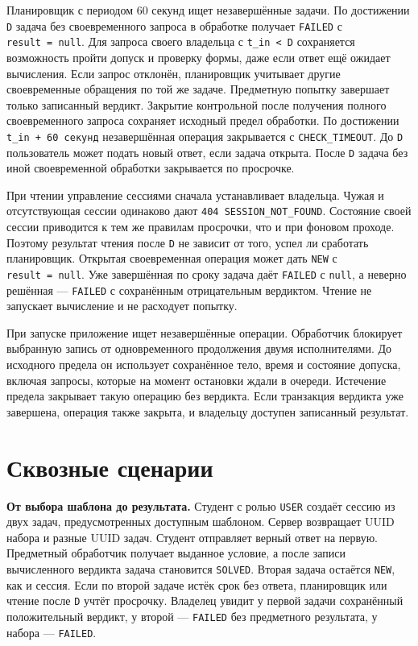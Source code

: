 \documentclass[12pt,a4paper]{article}
\begin{document}
\hypertarget{5-срок-чтение-и-восстановление}{}

Планировщик с периодом 60 секунд ищет незавершённые задачи. По достижении \texttt{D} задача без своевременного запроса в обработке получает \texttt{FAILED} с \texttt{result\ =\ null}. Для запроса своего владельца с \texttt{t\_in\ \textless{}\ D} сохраняется возможность пройти допуск и проверку формы, даже если ответ ещё ожидает вычисления. Если запрос отклонён, планировщик учитывает другие своевременные обращения по той же задаче. Предметную попытку завершает только записанный вердикт. Закрытие контрольной после получения полного своевременного запроса сохраняет исходный предел обработки. По достижении \texttt{t\_\allowbreak{}in + 60 секунд} незавершённая операция закрывается с \texttt{CHECK\_\allowbreak{}TIMEOUT}. До \texttt{D} пользователь может подать новый ответ, если задача открыта. После \texttt{D} задача без иной своевременной обработки закрывается по просрочке.

При чтении управление сессиями сначала устанавливает владельца. Чужая и отсутствующая сессии одинаково дают \texttt{404 SESSION\_\allowbreak{}NOT\_\allowbreak{}FOUND}. Состояние своей сессии приводится к тем же правилам просрочки, что и при фоновом проходе. Поэтому результат чтения после \texttt{D} не зависит от того, успел ли сработать планировщик. Открытая своевременная операция может дать \texttt{NEW} с \texttt{result\ =\ null}. Уже завершённая по сроку задача даёт \texttt{FAILED} с \texttt{null}, а неверно решённая --- \texttt{FAILED} с сохранённым отрицательным вердиктом. Чтение не запускает вычисление и не расходует попытку.

При запуске приложение ищет незавершённые операции. Обработчик блокирует выбранную запись от одновременного продолжения двумя исполнителями. До исходного предела он использует сохранённое тело, время и состояние допуска, включая запросы, которые на момент остановки ждали в очереди. Истечение предела закрывает такую операцию без вердикта. Если транзакция вердикта уже завершена, операция также закрыта, и владельцу доступен записанный результат.

\section{Сквозные сценарии}\label{6-ux441ux43aux432ux43eux437ux43dux44bux435-ux441ux446ux435ux43dux430ux440ux438ux438}

\hypertarget{6-сквозные-сценарии}{}

\textbf{От выбора шаблона до результата.} Студент с ролью \texttt{USER} создаёт сессию из двух задач, предусмотренных доступным шаблоном. Сервер возвращает UUID набора и разные UUID задач. Студент отправляет верный ответ на первую. Предметный обработчик получает выданное условие, а после записи вычисленного вердикта задача становится \texttt{SOLVED}. Вторая задача остаётся \texttt{NEW}, как и сессия. Если по второй задаче истёк срок без ответа, планировщик или чтение после \texttt{D} учтёт просрочку. Владелец увидит у первой задачи сохранённый положительный вердикт, у второй --- \texttt{FAILED} без предметного результата, у набора --- \texttt{FAILED}.
\end{document}
